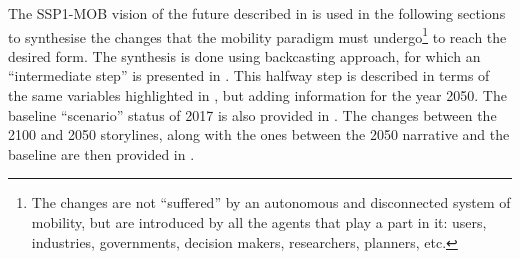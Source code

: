 The SSP1-MOB vision of the future described in  is used in the following sections to synthesise the changes that the mobility paradigm must undergo\footnote{The changes are not ``suffered'' by an autonomous and disconnected system of mobility, but are introduced by all the agents that play a part in it: users, industries, governments, decision makers, researchers, planners, etc.} to reach the desired form. The synthesis is done using backcasting approach, for which an ``intermediate step'' is presented in . This halfway step is described in terms of the same variables highlighted in , but adding information for the year 2050. The baseline ``scenario'' status of 2017 is also provided in . The changes between the 2100 and 2050 storylines, along with the ones between the 2050 narrative and the baseline are then provided in .

